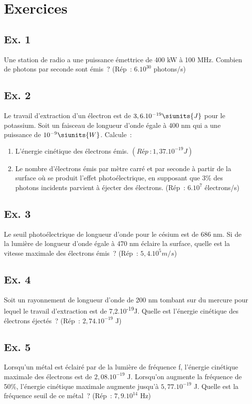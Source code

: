 {\hypertarget{exercices-photons}{%
\section{Exercices}\label{exercices-photons}

\hypertarget{exercice-1}{%
\subsection{Ex. 1}\label{exercice-1}
Une station de radio a une puissance émettrice de 400 kW à 100 MHz.
Combien de photons par seconde sont émis~? (Rép~:
$6.10^{30}$ photons/s)

\subsection{Ex. 2}
Le travail d'extraction d'un électron est de $3,6.10^{-19} \siunits{J}$ pour le potassium.
Soit un faisceau de longueur d'onde égale à 400 nm
qui a une puissance de $10^{-9} \siunits{W}$. Calcule~:
\begin{enumerate}
\item  L'énergie cinétique des électrons émis. $(Rép~:
  1,37.10^{-19} J)$
\item  Le nombre d'électrons émis par mètre carré et par seconde à partir de
  la surface où se produit l'effet photoélectrique, en supposant que 3\%
  des photons incidents parvient à éjecter des électrons. (Rép~:
  $6.10^7$ électrons/s)
\end{enumerate}

\subsection{Ex. 3}
Le seuil photoélectrique de longueur d'onde pour le césium est de 686
nm. Si de la lumière de longueur d'onde égale à 470 nm éclaire la
surface, quelle est la vitesse maximale des électrons émis~? (Rép~:
$5,4.10^5 m/s$)

\subsection{Ex. 4}
Soit un rayonnement de longueur d'onde de 200 nm tombant sur du mercure
pour lequel le travail d'extraction est de 7,2.10\textsuperscript{-19}J.
Quelle est l'énergie cinétique des électrons éjectés~? (Rép~:
$2,74.10^{-19}$ J)

\subsection{Ex. 5}
Lorsqu'un métal est éclairé par de la lumière de fréquence f, l'énergie
cinétique maximale des électrons est de $2,08.10^{-19}$ J.
Lorsqu'on augmente la fréquence de 50\%, l'énergie cinétique maximale
augmente jusqu'à $5,77.10^{-19}$ J.
Quelle est la fréquence seuil de ce métal~? (Rép~: $7,9.10^{14}$ Hz)

}}}
